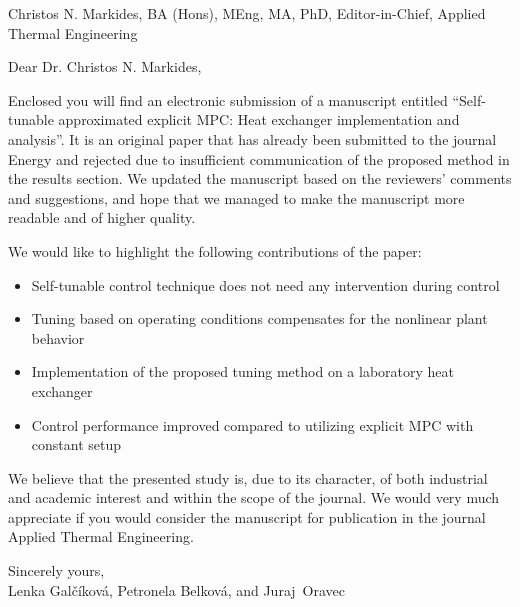 \documentclass[a4paper,10pt]{letter}
\begin{document}
\pagestyle{headings}
\begin{letter}{Christos N. Markides, BA (Hons), MEng, MA, PhD, Editor-in-Chief, Applied Thermal Engineering}

\opening{Dear Dr. Christos N. Markides,}

Enclosed you will find an electronic submission of a manuscript entitled ``Self-tunable approximated explicit MPC: Heat exchanger implementation and analysis''. It is an original paper that has already been submitted to the journal Energy and rejected due to insufficient communication of the proposed method in the results section. We updated the manuscript based on the reviewers' comments and suggestions, and hope that we managed to make the manuscript more readable and of higher quality. 

We would like to highlight the following contributions of the paper:
\begin{itemize}
	\item Self-tunable control technique does not need any intervention during control
	\item Tuning based on operating conditions compensates for the nonlinear plant behavior
	\item Implementation of the proposed tuning method on a laboratory heat exchanger 
	\item Control performance improved compared to utilizing explicit MPC with constant setup
\end{itemize}

We believe that the presented study is, due to its character, of both industrial and academic interest and within the scope of the journal. We would very much appreciate if you would consider the manuscript for publication in the journal Applied Thermal Engineering.

Sincerely yours, \\
Lenka Gal\v{c}\'{i}kov\'{a}, Petronela Belkov\'{a}, and Juraj~Oravec

\end{letter}
\end{document}
